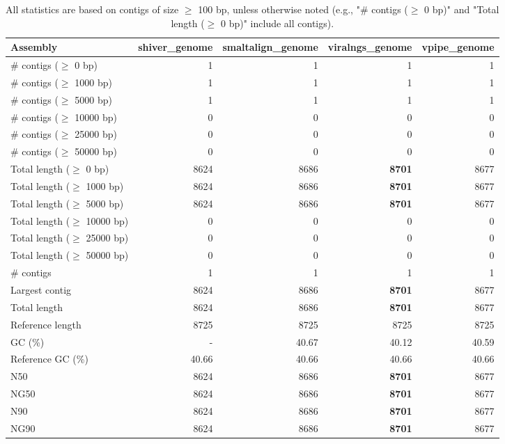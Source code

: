 \documentclass[12pt,a4paper]{article}
\begin{document}
\begin{table}[ht]
\begin{center}
\caption{All statistics are based on contigs of size $\geq$ 100 bp, unless otherwise noted (e.g., "\# contigs ($\geq$ 0 bp)" and "Total length ($\geq$ 0 bp)" include all contigs).}
\begin{tabular}{|l*{4}{|r}|}
\hline
Assembly & shiver\_genome & smaltalign\_genome & viralngs\_genome & vpipe\_genome \\ \hline
\# contigs ($\geq$ 0 bp) & 1 & 1 & 1 & 1 \\ \hline
\# contigs ($\geq$ 1000 bp) & 1 & 1 & 1 & 1 \\ \hline
\# contigs ($\geq$ 5000 bp) & 1 & 1 & 1 & 1 \\ \hline
\# contigs ($\geq$ 10000 bp) & 0 & 0 & 0 & 0 \\ \hline
\# contigs ($\geq$ 25000 bp) & 0 & 0 & 0 & 0 \\ \hline
\# contigs ($\geq$ 50000 bp) & 0 & 0 & 0 & 0 \\ \hline
Total length ($\geq$ 0 bp) & 8624 & 8686 & {\bf 8701} & 8677 \\ \hline
Total length ($\geq$ 1000 bp) & 8624 & 8686 & {\bf 8701} & 8677 \\ \hline
Total length ($\geq$ 5000 bp) & 8624 & 8686 & {\bf 8701} & 8677 \\ \hline
Total length ($\geq$ 10000 bp) & 0 & 0 & 0 & 0 \\ \hline
Total length ($\geq$ 25000 bp) & 0 & 0 & 0 & 0 \\ \hline
Total length ($\geq$ 50000 bp) & 0 & 0 & 0 & 0 \\ \hline
\# contigs & 1 & 1 & 1 & 1 \\ \hline
Largest contig & 8624 & 8686 & {\bf 8701} & 8677 \\ \hline
Total length & 8624 & 8686 & {\bf 8701} & 8677 \\ \hline
Reference length & 8725 & 8725 & 8725 & 8725 \\ \hline
GC (\%) & - & 40.67 & 40.12 & 40.59 \\ \hline
Reference GC (\%) & 40.66 & 40.66 & 40.66 & 40.66 \\ \hline
N50 & 8624 & 8686 & {\bf 8701} & 8677 \\ \hline
NG50 & 8624 & 8686 & {\bf 8701} & 8677 \\ \hline
N90 & 8624 & 8686 & {\bf 8701} & 8677 \\ \hline
NG90 & 8624 & 8686 & {\bf 8701} & 8677 \\ \hline

\end{tabular}
\end{center}
\end{table}
\end{document}
